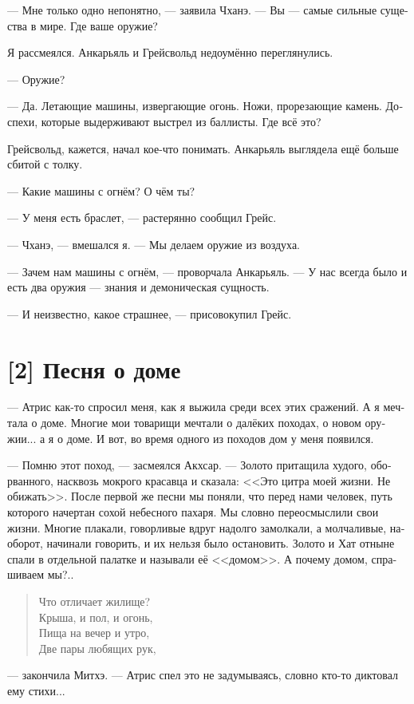 \documentclass[a4paper,12pt,fleqn]{book}\usepackage{cooltooltips}\usepackage{polyglossia}\setdefaultlanguage[babelshorthands=true]{russian}\setotherlanguage{english}\defaultfontfeatures{Ligatures=TeX,Mapping=tex-text} \usepackage{xcolor}\definecolor{lightgray}{HTML}{bbbbbb}\color{lightgray}\newcommand{\ml}[3]{\textenglish{\textcolor{black}{#3}}}
\begin{document}
{--- Мне только одно непонятно, --- заявила Чханэ.
--- Вы --- самые сильные существа в мире.
Где ваше оружие?

Я рассмеялся.
Анкарьяль и Грейсвольд недоумённо переглянулись.

--- Оружие?

--- Да.
Летающие машины, извергающие огонь.
Ножи, прорезающие камень.
Доспехи, которые выдерживают выстрел из баллисты.
Где всё это?

Грейсвольд, кажется, начал кое-что понимать.
Анкарьяль выглядела ещё больше сбитой с толку.

--- Какие машины с огнём?
О чём ты?

--- У меня есть браслет, --- растерянно сообщил Грейс.

--- Чханэ, --- вмешался я.
--- Мы делаем оружие из воздуха.

--- Зачем нам машины с огнём, --- проворчала Анкарьяль.
--- У нас всегда было и есть два оружия --- знания и демоническая сущность.

--- И неизвестно, какое страшнее, --- присовокупил Грейс.

\section{[2] Песня о доме}

--- Атрис как-то спросил меня, как я выжила среди всех этих сражений.
А я мечтала о доме.
Многие мои товарищи мечтали о далёких походах, о новом оружии... а я о доме.
И вот, во время одного из походов дом у меня появился.

--- Помню этот поход, --- засмеялся Акхсар.
--- Золото притащила худого, оборванного, насквозь мокрого красавца и сказала: <<Это цитра моей жизни.
Не обижать>>.
После первой же песни мы поняли, что перед нами человек, путь которого начертан сохой небесного пахаря.
Мы словно переосмыслили свои жизни.
Многие плакали, говорливые вдруг надолго замолкали, а молчаливые, наоборот, начинали говорить, и их нельзя было остановить.
Золото и Хат отныне спали в отдельной палатке и называли её <<домом>>.
А почему домом, спрашиваем мы?..

\begin{verse}
Что отличает жилище?\\
Крыша, и пол, и огонь,\\
Пища на вечер и утро,\\
Две пары любящих рук,
\end{verse}

--- закончила Митхэ.
--- Атрис спел это не задумываясь, словно кто-то диктовал ему стихи...

}
\end{document}
